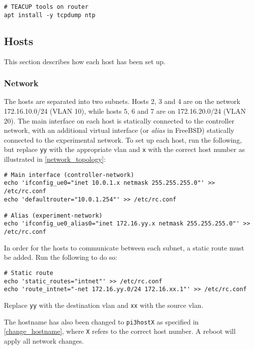 \begin{verbatim}
# TEACUP tools on router
apt install -y tcpdump ntp
\end{verbatim}






\subsection{Hosts}

This section describes how each host has been set up. 


\subsubsection{Network}

The hosts are separated into two subnets. Hosts 2, 3 and 4 are on the network 172.16.10.0/24 (VLAN 10), while hosts 5, 6 and 7 are on 172.16.20.0/24 (VLAN 20). The main interface on each host is statically connected to the controller network, with an additional virtual interface (or \textit{alias} in FreeBSD) statically connected to the experimental network. To set up each host, run the following, but replace \lstinline{yy} with the appropriate \gls{vlan} and \lstinline{x} with the correct host number as illustrated in \ref{network_topology}:

\begin{verbatim}
# Main interface (controller-network)
echo 'ifconfig_ue0="inet 10.0.1.x netmask 255.255.255.0"' >> /etc/rc.conf
echo 'defaultrouter="10.0.1.254"' >> /etc/rc.conf

# Alias (experiment-network)
echo 'ifconfig_ue0_alias0="inet 172.16.yy.x netmask 255.255.255.0"' >> /etc/rc.conf
\end{verbatim}

In order for the hosts to communicate between each subnet, a static route must be added. Run the following to do so:

\begin{verbatim}
# Static route
echo 'static_routes="intnet"' >> /etc/rc.conf
echo 'route_intnet="-net 172.16.yy.0/24 172.16.xx.1"' >> /etc/rc.conf
\end{verbatim}

Replace \lstinline{yy} with the destination \gls{vlan} and \lstinline{xx} with the source \gls{vlan}.

The hostname has also been changed to \lstinline{pi3hostX} as specified in \ref{change_hostname}, where \lstinline{X} refers to the correct host number. A reboot will apply all network changes.


